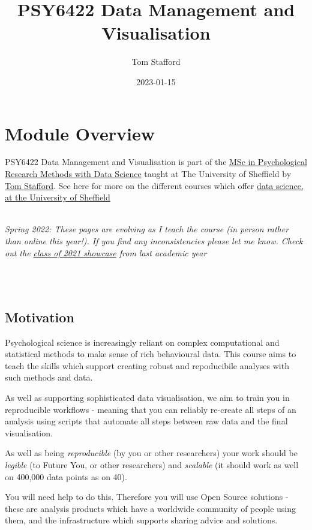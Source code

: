 \documentclass[
]{book}
\title{PSY6422 Data Management and Visualisation}
\author{Tom Stafford}
\date{2023-01-15}
\newenvironment{info}
    {
    \hline\\
    }
    { 
    \\\\\hline
    }
\begin{document}
\maketitle

{
\setcounter{tocdepth}{2}
\tableofcontents
}
\hypertarget{module-overview}{%
\chapter*{Module Overview}\label{module-overview}}


PSY6422 Data Management and Visualisation is part of the \href{https://www.sheffield.ac.uk/psychology/prospectivepg/masters/data-science}{MSc in Psychological Research Methods with Data Science} taught at The University of Sheffield by \href{http://tomstafford.staff.shef.ac.uk/}{Tom Stafford}. See here for more on the different courses which offer \href{notes.html\#data-science-sheffield}{data science, at the University of Sheffield}

\begin{info}
\emph{Spring 2022: These pages are evolving as I teach the course (in
person rather than online this year!). If you find any inconsistencies
please let me know. Check out the \href{class-of-2021.html}{class of
2021 showcase} from last academic year}
\end{info}

\hypertarget{motivation}{%
\section{Motivation}\label{motivation}}

Psychological science is increasingly reliant on complex computational and statistical methods to make sense of rich behavioural data. This course aims to teach the skills which support creating robust and repoducibile analyses with such methods and data.

As well as supporting sophisticated data visualisation, we aim to train you in reproducible workflows - meaning that you can reliably re-create all steps of an analysis using scripts that automate all steps between raw data and the final visualisation.

As well as being \emph{reproducible} (by you or other researchers) your work should be \emph{legible} (to Future You, or other researchers) and \emph{scalable} (it should work as well on 400,000 data points as on 40).

You will need help to do this. Therefore you will use Open Source solutions - these are analysis products which have a worldwide community of people using them, and the infrastructure which supports sharing advice and solutions.
\end{document}
